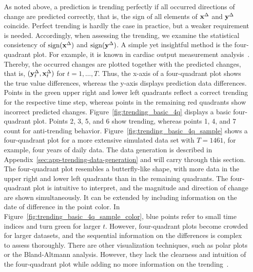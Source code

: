 As noted above, a prediction is trending perfectly if all occurred directions of change are predicted correctly, that is, the sign of all elements of $\mathbf{x}^{\Delta}$ and $\mathbf{y}^{\Delta}$ coincide.
Perfect trending is hardly the case in practice, but a weaker requirement is needed.
Accordingly, when assessing the trending, we examine the statistical consistency of $\operatorname{sign}(\mathbf{x}^{\Delta})$ and $\operatorname{sign}(\mathbf{y}^{\Delta})$.
A simple yet insightful method is the four-quadrant plot.
For example, it is known in cardiac output measurement analysis~\parencite{Saugel2015,perrino1998intraoperative}. 
Thereby, the occurred changes are plotted together with the predicted changes, that is, $(\mathbf{y}^{\Delta}_t, \mathbf{x}^{\Delta}_t)$ for $t = 1, \dots, T$.
Thus, the x-axis of a four-quadrant plot shows the true value differences, whereas the y-axis displays prediction data differences.
Points in the green upper right and lower left quadrants reflect a correct trending for the respective time step, whereas points in the remaining red quadrants show incorrect predicted changes.
Figure~\ref{fig:trending_basic_4q} displays a basic four-quadrant plot.
Points 2, 3, 5, and 6 show trending, whereas points 1, 4, and 7 count for anti-trending behavior.
Figure~\ref{fig:trending_basic_4q_sample} shows a four-quadrant plot for a more extensive simulated data set with $T=1461$, for example, four years of daily data.
The data generation is described in Appendix~\ref{sec:app-trending-data-generation} and will carry through this section.
The four-quadrant plot resembles a butterfly-like shape, with more data in the upper right and lower left quadrants than in the remaining quadrants.
The four-quadrant plot is intuitive to interpret, and the magnitude and direction of change are shown simultaneously.
It can be extended by including information on the date of difference in the point color.
In Figure~\ref{fig:trending_basic_4q_sample_color}, blue points refer to small time indices and turn green for larger $t$.
However, four-quadrant plots become crowded for larger datasets, and the sequential information on the differences is complex to assess thoroughly.
There are other visualization techniques, such as polar plots or the Bland-Altmann analysis.
However, they lack the clearness and intuition of the four-quadrant plot while adding no more information on the trending~\parencite{Saugel2015}.

